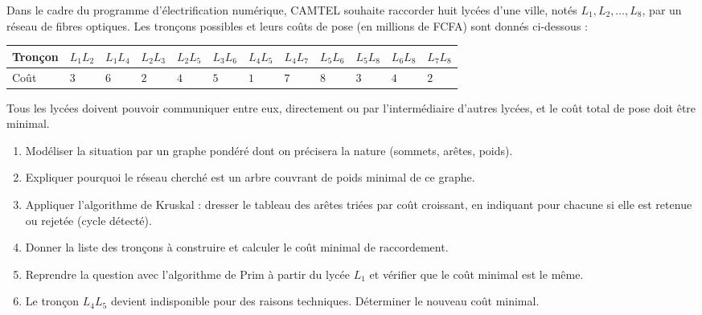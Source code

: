 \documentclass[11pt]{article}
\begin{document}
\begin{exercice}
Dans le cadre du programme d'électrification numérique, CAMTEL souhaite raccorder huit lycées d'une ville, notés $L_1, L_2, \ldots, L_8$, par un réseau de fibres optiques. Les tronçons possibles et leurs coûts de pose (en millions de FCFA) sont donnés ci-dessous :
\begin{center}
\begin{tabularx}{\linewidth}{|l|X|X|X|X|X|X|X|X|X|X|X|}
\hline
\rowcolor{popblueL} Tronçon & $L_1L_2$ & $L_1L_4$ & $L_2L_3$ & $L_2L_5$ & $L_3L_6$ & $L_4L_5$ & $L_4L_7$ & $L_5L_6$ & $L_5L_8$ & $L_6L_8$ & $L_7L_8$ \\
\hline
Coût & $3$ & $6$ & $2$ & $4$ & $5$ & $1$ & $7$ & $8$ & $3$ & $4$ & $2$ \\
\hline
\end{tabularx}
\end{center}
Tous les lycées doivent pouvoir communiquer entre eux, directement ou par l'intermédiaire d'autres lycées, et le coût total de pose doit être minimal.
\begin{enumerate}
\item Modéliser la situation par un graphe pondéré dont on précisera la nature (sommets, arêtes, poids).
\item Expliquer pourquoi le réseau cherché est un arbre couvrant de poids minimal de ce graphe.
\item Appliquer l'algorithme de Kruskal : dresser le tableau des arêtes triées par coût croissant, en indiquant pour chacune si elle est retenue ou rejetée (cycle détecté).
\item Donner la liste des tronçons à construire et calculer le coût minimal de raccordement.
\item Reprendre la question avec l'algorithme de Prim à partir du lycée $L_1$ et vérifier que le coût minimal est le même.
\item Le tronçon $L_4L_5$ devient indisponible pour des raisons techniques. Déterminer le nouveau coût minimal.
\end{enumerate}
\end{exercice}
\end{document}
